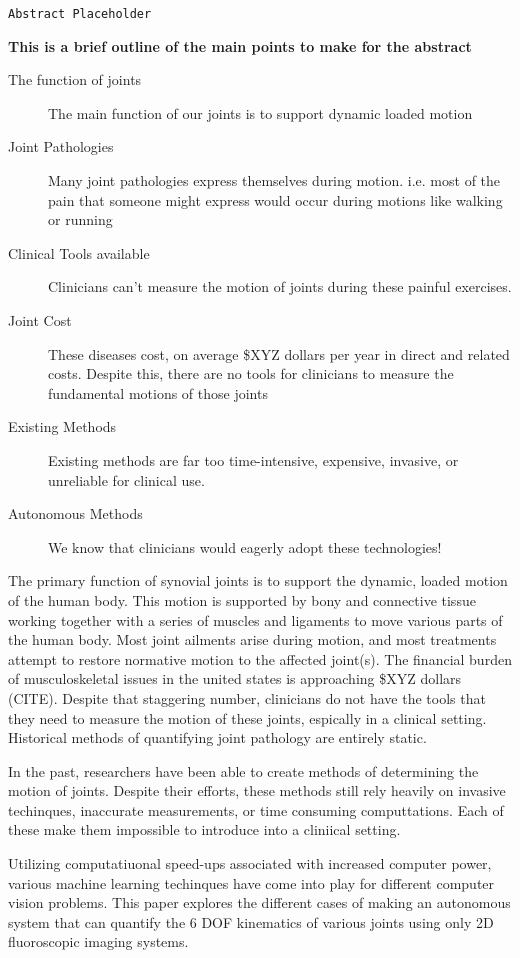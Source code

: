 \texttt{Abstract Placeholder}

{\bf \color{red} This is a brief outline of the main points to make for the abstract}

\begin{description}
    \item[The function of joints] The main function of our joints is to support dynamic loaded motion
    \item[Joint Pathologies] Many joint pathologies express themselves during motion. i.e. most of the pain that someone might express would occur during motions like walking or running
    \item[Clinical Tools available] Clinicians can't measure the motion of joints during these painful exercises. 
    \item[Joint Cost] These diseases cost, on average \$XYZ dollars per year in direct and related costs. Despite this, there are no tools for clinicians to measure the fundamental motions of those joints
    \item[Existing Methods] Existing methods are far too time-intensive, expensive, invasive, or unreliable for clinical use.
    \item[Autonomous Methods] We know that clinicians would eagerly adopt these technologies!  
\end{description}

The primary function of synovial joints is to support the dynamic, loaded motion of the human body. This motion is supported by bony and connective tissue working together with a series of muscles and ligaments to move various parts of the human body. Most joint ailments arise during motion, and most treatments attempt to restore normative motion to the affected joint(s). The financial burden of musculoskeletal issues in the united states is approaching \$XYZ dollars (CITE). Despite that staggering number, clinicians do not have the tools that they need to measure the motion of these joints, espically in a clinical setting. Historical methods of quantifying joint pathology are entirely static. 

In the past, researchers have been able to create methods of determining the motion of joints. Despite their efforts, these methods still rely heavily on invasive techinques, inaccurate measurements, or time consuming computtations. Each of these make them impossible to introduce into a cliniical setting.

Utilizing computatiuonal speed-ups associated with increased computer power, various machine learning techinques have come into play for different computer vision problems. This paper explores the different cases of making an autonomous system that can quantify the 6 DOF kinematics of various joints using only 2D fluoroscopic imaging systems.

